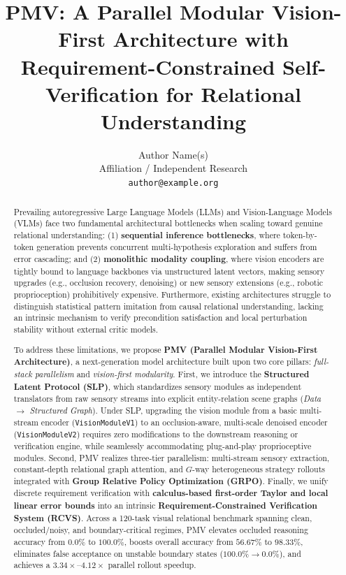 \documentclass[10pt,twocolumn]{article}
\title{\textbf{PMV: A Parallel Modular Vision-First Architecture with Requirement-Constrained Self-Verification for Relational Understanding}}
\author{
  Author Name(s) \\
  Affiliation / Independent Research \\
  \texttt{author@example.org}
}
\date{}
\begin{document}
\maketitle

\begin{abstract}
Prevailing autoregressive Large Language Models (LLMs) and Vision-Language Models (VLMs) face two fundamental architectural bottlenecks when scaling toward genuine relational understanding: (1) \textbf{sequential inference bottlenecks}, where token-by-token generation prevents concurrent multi-hypothesis exploration and suffers from error cascading; and (2) \textbf{monolithic modality coupling}, where vision encoders are tightly bound to language backbones via unstructured latent vectors, making sensory upgrades (e.g., occlusion recovery, denoising) or new sensory extensions (e.g., robotic proprioception) prohibitively expensive. Furthermore, existing architectures struggle to distinguish statistical pattern imitation from causal relational understanding, lacking an intrinsic mechanism to verify precondition satisfaction and local perturbation stability without external critic models.

To address these limitations, we propose \textbf{PMV (Parallel Modular Vision-First Architecture)}, a next-generation model architecture built upon two core pillars: \emph{full-stack parallelism} and \emph{vision-first modularity}. First, we introduce the \textbf{Structured Latent Protocol (SLP)}, which standardizes sensory modules as independent translators from raw sensory streams into explicit entity-relation scene graphs (\emph{Data $\rightarrow$ Structured Graph}). Under SLP, upgrading the vision module from a basic multi-stream encoder (\texttt{VisionModuleV1}) to an occlusion-aware, multi-scale denoised encoder (\texttt{VisionModuleV2}) requires zero modifications to the downstream reasoning or verification engine, while seamlessly accommodating plug-and-play proprioceptive modules. Second, PMV realizes three-tier parallelism: multi-stream sensory extraction, constant-depth relational graph attention, and $G$-way heterogeneous strategy rollouts integrated with \textbf{Group Relative Policy Optimization (GRPO)}. Finally, we unify discrete requirement verification with \textbf{calculus-based first-order Taylor and local linear error bounds} into an intrinsic \textbf{Requirement-Constrained Verification System (RCVS)}. Across a 120-task visual relational benchmark spanning clean, occluded/noisy, and boundary-critical regimes, PMV elevates occluded reasoning accuracy from $0.0\%$ to $100.0\%$, boosts overall accuracy from $56.67\%$ to $98.33\%$, eliminates false acceptance on unstable boundary states ($100.0\% \rightarrow 0.0\%$), and achieves a $3.34\times$--$4.12\times$ parallel rollout speedup.
\end{abstract}
\end{document}
